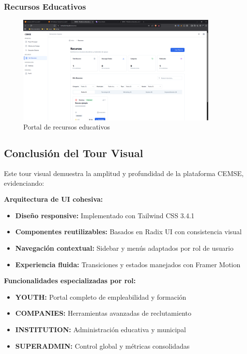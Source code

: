 \documentclass[12pt,a4paper]{article}
\begin{document}
\begin{enumerate}
\subsubsection{Recursos Educativos}
\begin{figure}[H]
    \centering
    \includegraphics[width=0.9\textwidth]{screenshots/features/resources.png}
    \caption{Portal de recursos educativos}
    \label{fig:resources}
\end{figure}

\subsection{Conclusión del Tour Visual}

Este tour visual demuestra la amplitud y profundidad de la plataforma CEMSE, evidenciando:

\textbf{Arquitectura de UI cohesiva:}
\begin{itemize}
    \item \textbf{Diseño responsive:} Implementado con Tailwind CSS 3.4.1
    \item \textbf{Componentes reutilizables:} Basados en Radix UI con consistencia visual
    \item \textbf{Navegación contextual:} Sidebar y menús adaptados por rol de usuario
    \item \textbf{Experiencia fluida:} Transiciones y estados manejados con Framer Motion
\end{itemize}

\textbf{Funcionalidades especializadas por rol:}
\begin{itemize}
    \item \textbf{YOUTH:} Portal completo de empleabilidad y formación
    \item \textbf{COMPANIES:} Herramientas avanzadas de reclutamiento
    \item \textbf{INSTITUTION:} Administración educativa y municipal
    \item \textbf{SUPERADMIN:} Control global y métricas consolidadas
\end{itemize}


\end{enumerate}
\end{document}
